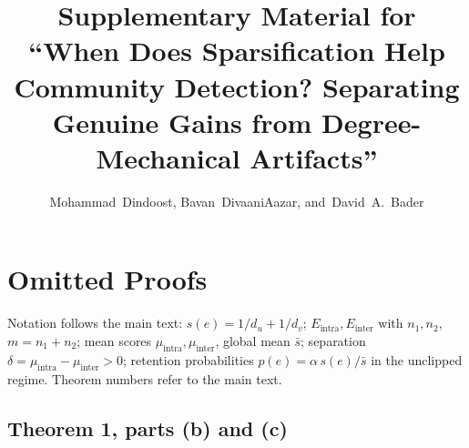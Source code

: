 \documentclass[10pt,journal,compsoc]{IEEEtran}
\title{Supplementary Material for\\``When Does Sparsification Help Community Detection? Separating Genuine Gains from Degree-Mechanical Artifacts''}
\author{Mohammad~Dindoost, Bavan~DivaaniAazar, and~David~A.~Bader}
\begin{document}
\maketitle

\section{Omitted Proofs}

Notation follows the main text: $s(e) = 1/d_u + 1/d_v$; $E_{\text{intra}}, E_{\text{inter}}$ with $n_1, n_2$, $m = n_1 + n_2$; mean scores $\mu_{\text{intra}}, \mu_{\text{inter}}$, global mean $\bar{s}$; separation $\delta = \mu_{\text{intra}} - \mu_{\text{inter}} > 0$; retention probabilities $p(e) = \alpha\, s(e)/\bar{s}$ in the unclipped regime.
Theorem numbers refer to the main text.

\subsection{Theorem 1, parts (b) and (c)}
\end{document}
